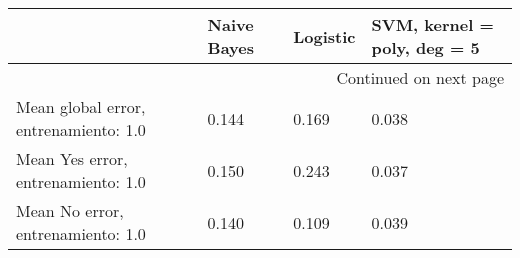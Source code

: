 \begin{longtable}{p{4cm}|p{1.5cm}|p{1.5cm}|p{1.5cm}}
\toprule
{} &  Naive Bayes &  Logistic &  SVM, kernel = poly, deg = 5 \\
\midrule
\endhead
\midrule
\multicolumn{4}{r}{{Continued on next page}} \\
\midrule
\endfoot

\bottomrule
\endlastfoot
Mean global error, entrenamiento: 1.0 &        0.144 &     0.169 &                        0.038 \\
Mean Yes error, entrenamiento: 1.0    &        0.150 &     0.243 &                        0.037 \\
Mean No error, entrenamiento: 1.0     &        0.140 &     0.109 &                        0.039 \\
\end{longtable}
